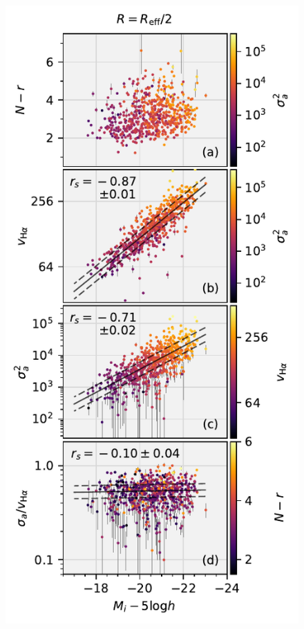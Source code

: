 \documentclass[apj,iop,revtex4,numberedappendix]{emulateapj}
\begin{document}
\begin{figure}
%
\begin{center}
%
\includegraphics[width=1.0\columnwidth]{figs/mi_models.pdf}

\end{center}
\end{figure}
\end{document}
